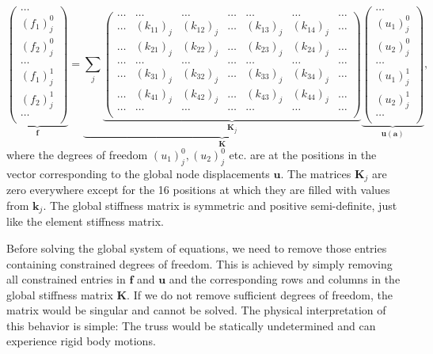\begin{equation}
    \underbrace{
    \begin{pmatrix}
        \dots \\ (f_1)^0_j \\ (f_2)^0_j \\ \dots \\ (f_1)^1_j \\ (f_2)^1_j \\ \dots \\
    \end{pmatrix}}_{\mathbf{f}}
    =
    \underbrace{
    \sum_j
    \underbrace{
    \begin{pmatrix}
    \dots & \dots & \dots & \dots & \dots & \dots & \dots \\
    \dots & (k_{11})_j & (k_{12})_j & \dots & (k_{13})_j & (k_{14})_j & \dots  \\
    \dots & (k_{21})_j & (k_{22})_j & \dots & (k_{23})_j & (k_{24})_j & \dots  \\
    \dots & \dots & \dots & \dots & \dots & \dots & \dots  \\
    \dots & (k_{31})_j & (k_{32})_j & \dots & (k_{33})_j & (k_{34})_j & \dots  \\
    \dots & (k_{41})_j & (k_{42})_j & \dots & (k_{43})_j & (k_{44})_j & \dots  \\
    \dots & \dots & \dots & \dots & \dots & \dots & \dots  \\
    \end{pmatrix}}_{\mathbf{K}_j}
    }_{\mathbf{K}}
    \underbrace{
    \begin{pmatrix}
        \dots \\ (u_1)^0_j \\ (u_2)^0_j \\ \dots \\ (u_1)^1_j \\ (u_2)^1_j \\ \dots \\
    \end{pmatrix}}_{\mathbf{u} (\mathbf{a})},
\end{equation}
where the degrees of freedom $(u_1)^0_j, (u_2)^0_j$ etc. are at the positions in the vector corresponding to the global node displacements $\mathbf{u}$. The matrices $\mathbf{K}_j$ are zero everywhere except for the 16 positions at which they are filled with values from $\mathbf{k}_j$.
The global stiffness matrix is symmetric and positive semi-definite, just like the element stiffness matrix.

Before solving the global system of equations, we need to remove those entries containing constrained degrees of freedom. This is achieved by simply removing all constrained entries in $\mathbf{f}$ and $\mathbf{u}$ and the corresponding rows and columns in the global stiffness matrix $\mathbf{K}$. If we do not remove sufficient degrees of freedom, the matrix would be singular and cannot be solved. The physical interpretation of this behavior is simple: The truss would be statically undetermined and can experience rigid body motions.

